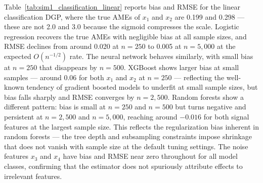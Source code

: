 \documentclass[12pt]{article}
\begin{document}
	Table~\ref{tab:sim1_classification_linear} reports bias and RMSE for the linear classification DGP, where the true AMEs of $x_1$ and $x_2$ are 0.199 and 0.298 --- these are not 2.0 and 3.0 because the sigmoid compresses the scale. Logistic regression recovers the true AMEs with negligible bias at all sample sizes, and RMSE declines from around 0.020 at $n=250$ to 0.005 at $n=5{,}000$ at the expected $O(n^{-1/2})$ rate. The neural network behaves similarly, with small bias at $n=250$ that disappears by $n=500$. XGBoost shows larger bias at small samples --- around 0.06 for both $x_1$ and $x_2$ at $n=250$ --- reflecting the well-known tendency of gradient boosted models to underfit at small sample sizes, but bias falls sharply and RMSE converges by $n=2{,}500$. Random forests show a different pattern: bias is small at $n=250$ and $n=500$ but turns negative and persistent at $n=2{,}500$ and $n=5{,}000$, reaching around $-0.016$ for both signal features at the largest sample size. This reflects the regularization bias inherent in random forests --- the tree depth and subsampling constraints impose shrinkage that does not vanish with sample size at the default tuning settings. The noise features $x_3$ and $x_4$ have bias and RMSE near zero throughout for all model classes, confirming that the estimator does not spuriously attribute effects to irrelevant features.
	
\end{document}
